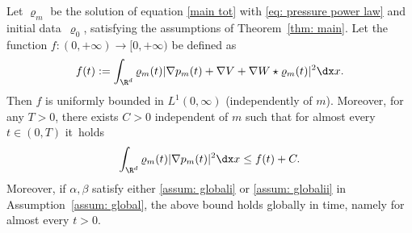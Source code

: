 \begin{proposition}\label{prop: grad power rho}
Let $\varrho_m$ be the solution of equation \eqref{main tot} with \eqref{eq: pressure power law} and initial data~$\varrho_0$, satisfying the assumptions of Theorem~\ref{thm: main}.
Let the function $f:(0,+\infty) \to [0,+\infty)$ be defined as
\begin{equation}\label{eq: f}
f(t):=\int_{\R^d} \varrho_m (t)|\nabla p_m(t) + \nabla V+ \nabla W \star \varrho_m(t)|^2\dx x.
\end{equation}
Then $f$ is uniformly bounded in $L^{1}(0,\infty)$ (independently of $m$). Moreover, for any $T>0$, there exists $C>0$ independent of $m$ such that for almost every $t\in(0,T)$ it~holds
\begin{equation}\label{eq: bound}
\int_{\R^d} \varrho_m(t) |\nabla p_m(t)|^2 \dx x \leq f(t) + C.
\end{equation}
Moreover, if $\alpha,\beta$ satisfy either \eqref{assum: globali} or \eqref{assum: globalii} in Assumption~\ref{assum: global}, the above bound holds globally in time, namely for almost every $t>0$.
\end{proposition}


